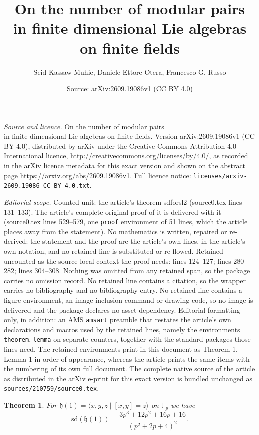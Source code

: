 \documentclass[10pt,a4paper]{amsart}
\title{On the number of modular pairs\\ in finite dimensional Lie algebras on finite fields}
\author{Seid Kassaw Muhie, Daniele Ettore Otera, Francesco G. Russo}
\date{Source: arXiv:2609.19086v1 (CC BY 4.0)}
\newtheorem{theorem}{Theorem}
\begin{document}
\maketitle

\noindent\emph{Source and licence.} On the number of modular pairs\\ in finite dimensional Lie algebras on finite fields. Version arXiv:2609.19086v1 (CC BY 4.0), distributed by arXiv under the Creative Commons Attribution 4.0 International licence, http://creativecommons.org/licenses/by/4.0/, as recorded in the arXiv licence metadata for this exact version and shown on the abstract page https://arxiv.org/abs/2609.19086v1. Full licence notice: \texttt{licenses/arxiv-2609.19086-CC-BY-4.0.txt}.\par\smallskip

\noindent\textit{Editorial scope.} Counted unit: the article's theorem sdforsl2 (source0.tex lines 131--133). The article's complete original proof of it is delivered with it (source0.tex lines 529--579, one \texttt{proof} environment of 51 lines, which the article places away from the statement). No mathematics is written, repaired or re-derived: the statement and the proof are the article's own lines, in the article's own notation, and no retained line is substituted or re-flowed.  Retained uncounted as the source-local context the proof needs: lines 124--127; lines 280--282; lines 304--308.  Nothing was omitted from any retained span, so the package carries no omission record.  No retained line contains a citation, so the wrapper carries no bibliography and no bibliography entry.  No retained line contains a figure environment, an image-inclusion command or drawing code, so no image is delivered and the package declares no asset dependency.  Editorial formatting only, in addition: an AMS \texttt{amsart} preamble that restates the article's own declarations and macros used by the retained lines, namely the environments \texttt{theorem}, \texttt{lemma} on separate counters, together with the standard packages those lines need.  The retained environments print in this document as Theorem 1, Lemma 1 in order of appearance, whereas the article prints the same items with the numbering of its own full document.  The complete native source of the article as distributed in the arXiv e-print for this exact version is bundled unchanged as \texttt{sources/210759/source0.tex}.
\begin{theorem} \label{heisenberg}
   For  \(\mathfrak{h}(1)=\langle x,y,z \mid [x,y]=z\rangle \) on \(\mathbb{F}_{p}\) we have 
   $$\mathrm{sd}(\mathfrak{h}(1))=\frac{3p^3+12p^2+16p+16}{{(p^2+2p+4)^2}}.$$
\end{theorem}
\end{document}

